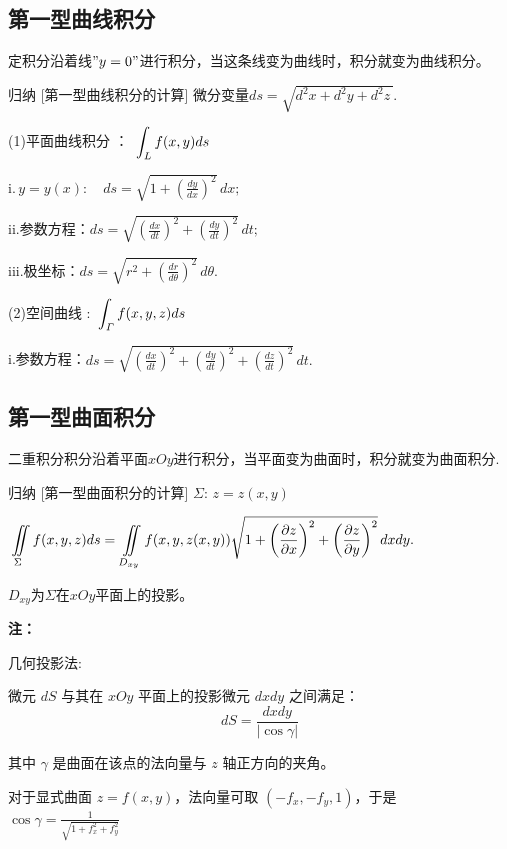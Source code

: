 \documentclass[a4paper,12pt,oneside,fontset=none]{ctexbook}
\let\oldint\int
\renewcommand{\int}{\displaystyle{\vrule width 0pt height 0em depth 0em}\oldint}
\let\oldiint\iint
\renewcommand{\iint}{\displaystyle{\vrule width 0pt height 0em depth 0em}\oldiint}
\newenvironment{induction}[1][]{\begin{thmBox}{归纳}{#1}}{\end{thmBox}}
\newenvironment{note}{
    \par\vspace{0.5em}\noindent
    \textbf{\color{NoteColor} 注：}
}{
    \par\vspace{0.5em}
}
\numberwithin{equation}{chapter}
\begin{document}
\subsection{第一型曲线积分}
定积分沿着线$"y=0"$进行积分，当这条线变为曲线时，积分就变为曲线积分。
\begin{induction}
    [第一型曲线积分的计算]
    微分变量$ds = \sqrt{d^2x + d^2y + d^2z\,}.$

    (1)平面曲线积分 ： $\int_L f(x,y)ds$

    i.$\,y = y(x): \quad ds = \sqrt{1 + \left(\frac{dy}{dx}\right)^2} \, dx;$
    
    ii.参数方程：$ ds = \sqrt{\left(\frac{dx}{dt}\right)^2 + \left(\frac{dy}{dt}\right)^2} \, dt;$

    iii.极坐标：$ds = \sqrt{r^2 + \left(\frac{dr}{d\theta}\right)^2} \, d\theta.$


    (2)空间曲线 : $\int_\varGamma f(x,y,z)ds$

    i.参数方程：$ds = \sqrt{\left(\frac{dx}{dt}\right)^2 + \left(\frac{dy}{dt}\right)^2 + \left(\frac{dz}{dt}\right)^2} \, dt.$
\end{induction}

\subsection{第一型曲面积分}
二重积分积分沿着平面$xOy$进行积分，当平面变为曲面时，积分就变为曲面积分.
\begin{induction}
    [第一型曲面积分的计算]
    $\Sigma:\, z=z(x,y)$

    $\iint\limits_{\Sigma} f(x,y,z)ds = \iint\limits_{D_{xy}} f(x,y,z(x,y)) \sqrt{1 + \left(\frac{\partial z}{\partial x}\right)^2 + \left(\frac{\partial z}{\partial y}\right)^2} \, dx dy.$  
    
    $D_{xy}$为$\Sigma$在$xOy$平面上的投影。

    \color{blue}{$z = f(x,y)$必须是单值函数才能进行投影，否则需要使用对称性、拆分区域处理。}
\end{induction}
\begin{note}
几何投影法:

微元 $dS$ 与其在 $xOy$ 平面上的投影微元 $dxdy$ 之间满足：
$$dS = \frac{dxdy}{|\cos \gamma|}$$

其中 $\gamma$ 是曲面在该点的法向量与 $z$ 轴正方向的夹角。

对于显式曲面 $z=f(x,y)$，法向量可取 $(-f_x, -f_y, 1)$，于是
$\cos\gamma = \frac{1}{\sqrt{1+f_x^2+f_y^2}}$
\end{note}
\end{document}
